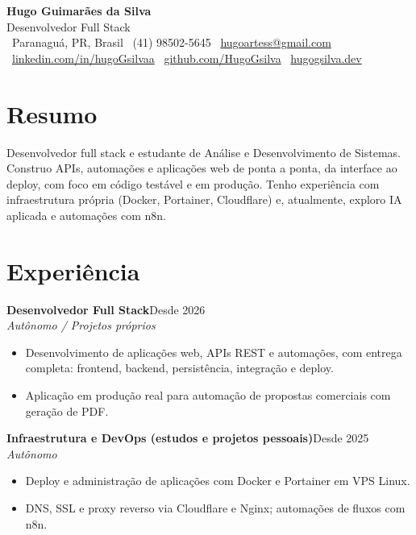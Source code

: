\documentclass[a4paper,10pt]{article}
\newcommand{\entry}[3]{%
  \textbf{#1}\hfill{\color{muted}\small #2}\\
  {\color{muted}\itshape #3}\par\vspace{2pt}
}
\begin{document}
{\Huge\bfseries\color{dark} Hugo Guimarães da Silva}\\[3pt]
{\large\color{accent} Desenvolvedor Full Stack}\\[6pt]

\small
\faMapMarker*\ Paranaguá, PR, Brasil \quad
\faPhone*\ (41) 98502-5645 \quad
\faEnvelope\ \href{mailto:hugoartess@gmail.com}{hugoartess@gmail.com}\\[2pt]
\faLinkedin\ \href{https://linkedin.com/in/hugoGsilvaa}{linkedin.com/in/hugoGsilvaa} \quad
\faGithub\ \href{https://github.com/HugoGsilva}{github.com/HugoGsilva} \quad
\faGlobe\ \href{https://hugogsilva.dev}{hugogsilva.dev}
\normalsize

\section{Resumo}
Desenvolvedor full stack e estudante de Análise e Desenvolvimento de Sistemas. Construo
APIs, automações e aplicações web de ponta a ponta, da interface ao deploy, com foco em
código testável e em produção. Tenho experiência com infraestrutura própria (Docker,
Portainer, Cloudflare) e, atualmente, exploro IA aplicada e automações com n8n.

\section{Experiência}
\entry{Desenvolvedor Full Stack}{Desde 2026}{Autônomo / Projetos próprios}
\begin{itemize}
  \item Desenvolvimento de aplicações web, APIs REST e automações, com entrega completa: frontend, backend, persistência, integração e deploy.
  \item Aplicação em produção real para automação de propostas comerciais com geração de PDF.
\end{itemize}
\vspace{2pt}
\entry{Infraestrutura e DevOps (estudos e projetos pessoais)}{Desde 2025}{Autônomo}
\begin{itemize}
  \item Deploy e administração de aplicações com Docker e Portainer em VPS Linux.
  \item DNS, SSL e proxy reverso via Cloudflare e Nginx; automações de fluxos com n8n.
\end{itemize}
\end{document}
